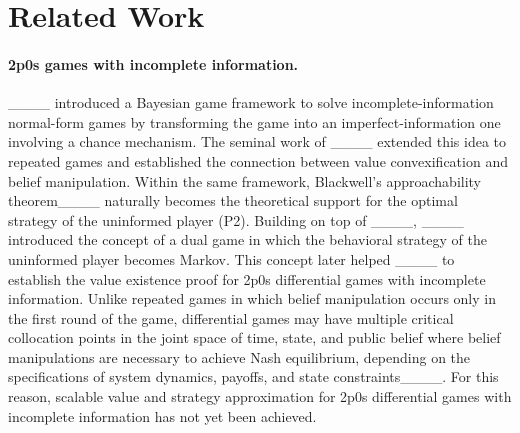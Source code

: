 \section{Related Work}
\paragraph{2p0s games with incomplete information.}
____ introduced a Bayesian game framework to solve incomplete-information normal-form games by transforming the game into an imperfect-information one involving a chance mechanism. The seminal work of ____ extended this idea to repeated games and established the connection between value convexification and belief manipulation. Within the same framework, Blackwell's approachability theorem____ naturally becomes the theoretical support for the optimal strategy of the uninformed player (P2). Building on top of ____, ____ introduced the concept of a dual game in which the behavioral strategy of the uninformed player becomes Markov. This concept later helped ____ to establish the value existence proof for 2p0s differential games with incomplete information. Unlike repeated games in which belief manipulation occurs only in the first round of the game, differential games may have multiple critical collocation points in the joint space of time, state, and public belief where belief manipulations are necessary to achieve Nash equilibrium, depending on the specifications of system dynamics, payoffs, and state constraints____. For this reason, scalable value and strategy approximation for 2p0s differential games with incomplete information has not yet been achieved. 

\vspace{-0.05in}
